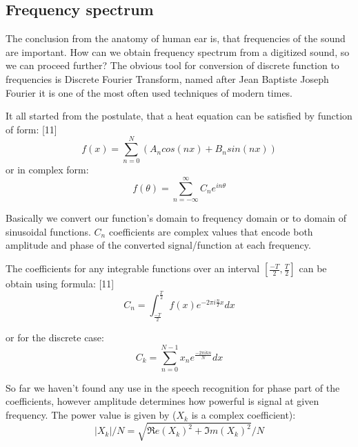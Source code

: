 \documentclass[12pt,a4paper,english]{article}
\begin{document}
\newpage
\subsection{Frequency spectrum}

The conclusion from the anatomy of human ear is, that frequencies of the sound are important.
How can we obtain frequency spectrum from a digitized sound, so we can proceed further? \newline
The obvious tool for conversion of discrete function to frequencies is Discrete Fourier Transform, named after Jean Baptiste Joseph Fourier it is one of the most often used techniques of modern times. \newline

It all started from the postulate, that a heat equation can be satisfied by function of form: [11] \newline
\begin{equation}
    f(x)=\sum_{n=0}^N(A_n cos(nx) + B_n sin(nx))
\end{equation}
or in complex form:
\begin{equation}
    f(\theta)=\sum_{n=-\infty}^{\infty} C_n e^{i n \theta}
\end{equation}

Basically we convert our function's domain to frequency domain or to domain of sinusoidal functions. $C_n$ coefficients are complex values that encode both amplitude and phase of the converted signal/function at each frequency. \newline

The coefficients for any integrable functions over an interval $[\frac{-T}{2}, \frac{T}{2}]$ can be obtain using formula: [11] \newline
\begin{equation}
    C_n=\int_{\frac{-T}{2}}^{\frac{T}{2}} f(x) e^{-2 \pi i \frac{n}{T} x} dx
\end{equation}

or for the discrete case:
\begin{equation}
    C_k=\sum_{n=0}^{N-1} x_n e^{\frac{-2 \pi i k n}{N}} dx
\end{equation}
	

So far we haven't found any use in the speech recognition for phase part of the coefficients, however amplitude determines how powerful is signal at given frequency. The power value is given by ($X_k$ is a complex coefficient):
\begin{equation}
    |X_k|/N = \sqrt{\Re e(X_k)^2 + \Im m(X_k)^2} / N
\end{equation}
\end{document}

